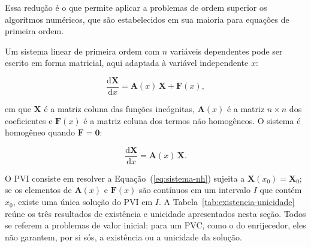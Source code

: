 \documentclass[arial,centeredequations,english,brazilian,oneside,section=TITLE]{ifes8}
\begin{document}
Essa redução é o que permite aplicar a problemas de ordem superior os algoritmos
numéricos, que são estabelecidos em sua maioria para equações de primeira ordem.
 
Um sistema linear de primeira ordem com $n$ variáveis dependentes pode ser escrito em
forma matricial, aqui adaptada à variável independente $x$:

\begin{equation}
  \label{eq:sistema-nh}
  \frac{\mathrm{d}\mathbf{X}}{\mathrm{d}x} = \mathbf{A}(x)\,\mathbf{X} + \mathbf{F}(x),
\end{equation}

em que $\mathbf{X}$ é a matriz coluna das funções incógnitas, $\mathbf{A}(x)$ é a matriz
$n \times n$ dos coeficientes e $\mathbf{F}(x)$ é a matriz coluna dos termos não
homogêneos. O sistema é homogêneo quando $\mathbf{F} = \mathbf{0}$:

\begin{equation}
  \label{eq:sistema-h}
  \frac{\mathrm{d}\mathbf{X}}{\mathrm{d}x} = \mathbf{A}(x)\,\mathbf{X}.
\end{equation}

O PVI consiste em resolver a Equação~(\ref{eq:sistema-nh}) sujeita a
$\mathbf{X}(x_0) = \mathbf{X}_0$; se os elementos de $\mathbf{A}(x)$ e $\mathbf{F}(x)$
são contínuos em um intervalo $I$ que contém $x_0$, existe uma única solução do PVI em
$I$. A Tabela~\ref{tab:existencia-unicidade} reúne os três
resultados de existência e unicidade apresentados nesta seção. Todos se referem a
problemas de valor inicial: para um PVC, como o do enrijecedor, eles não garantem, por
si sós, a existência ou a unicidade da solução.
 
\end{document}

